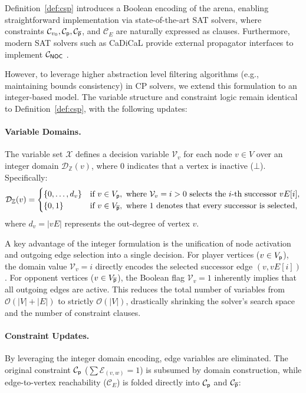 \documentclass[a4paper,fleqn]{cas-sc}
\begin{document}
Definition~\ref{def:csp} introduces a Boolean encoding of the arena, enabling straightforward implementation via state-of-the-art SAT solvers, where constraints $\mathcal{C}_{v_0}, \mathcal{C}_{\mathsf{p}}, \mathcal{C}_{\overline{\mathsf{p}}}$, and $\mathcal{C}_{E}$ are naturally expressed as clauses. Furthermore, modern SAT solvers such as CaDiCaL provide external propagator interfaces to implement $\mathcal{C}_{{\textsf{NOC}}}$ \citep{Fazekas:2023}.

However, to leverage higher abstraction level filtering algorithms (e.g., maintaining bounds consistency) in CP solvers, we extend this formulation to an integer-based model. The variable structure and constraint logic remain identical to Definition~\ref{def:csp}, with the following updates:

\paragraph{Variable Domains.} The variable set $\mathcal{X}$ defines a decision variable $\mathcal{V}_v$ for each node $v \in V$ over an integer domain $\mathcal{D}_{\mathbb{Z}}(v)$, where $0$ indicates that a vertex is inactive ($\bot$). Specifically:
\[
\mathcal{D}_{\mathbb{Z}}(v) = 
\begin{cases} 
    \{0, \dots, d_v\} & \text{if } v \in V_{\mathsf{p}}, \text{ where } \mathcal{V}_v = i > 0 \text{ selects the } i\text{-th successor } vE[i], \\
    \{0, 1\} & \text{if } v \in V_{\overline{\mathsf{p}}}, \text{ where } 1 \text{ denotes that every successor is selected,}
\end{cases}
\]
where $d_v = |vE|$ represents the out-degree of vertex $v$.

A key advantage of the integer formulation is the unification of node activation and outgoing edge selection into a single decision. For player vertices ($v \in V_{\mathsf{p}}$), the domain value $\mathcal{V}_v = i$ directly encodes the selected successor edge $(v, vE[i])$. For opponent vertices ($v \in V_{\overline{\mathsf{p}}}$), the Boolean flag $\mathcal{V}_v = 1$ inherently implies that all outgoing edges are active. This reduces the total number of variables from $\mathcal{O}(|V| + |E|)$ to strictly $\mathcal{O}(|V|)$, drastically shrinking the solver's search space and the number of constraint clauses.

\paragraph{Constraint Updates.} 
By leveraging the integer domain encoding, edge variables are eliminated. The original constraint $\mathcal{C}_{\mathsf{p}}$ ($\sum \mathcal{E}_{(v,w)} = 1$) is subsumed by domain construction, while edge-to-vertex reachability ($\mathcal{C}_{E}$) is folded directly into $\mathcal{C}_{\mathsf{p}}$ and $\mathcal{C}_{\overline{\mathsf{p}}}$:
\end{document}
